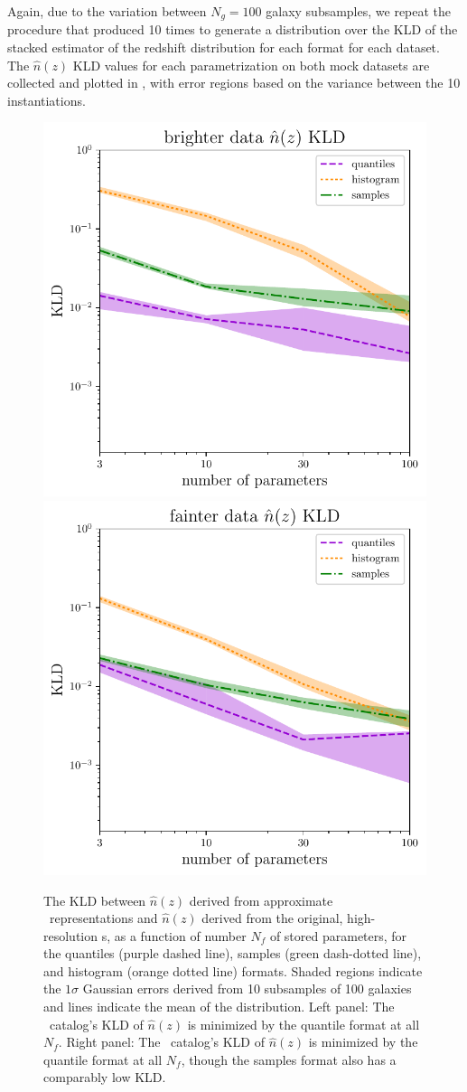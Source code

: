 Again, due to the variation between $N_{g}=100$ galaxy subsamples, we repeat 
the procedure that produced  10 times to generate a 
distribution over the KLD of the stacked estimator of the redshift distribution 
for each format for each dataset.
The $\hat{n}(z)$ KLD values for each parametrization on both mock datasets are 
collected and plotted in , with error regions based on the 
variance between the 10 instantiations.
\begin{figure}
	\begin{center}
		\includegraphics[width=0.49\columnwidth]{figures/qp/graham_nz_kld.pdf}    
		\includegraphics[width=0.49\columnwidth]{figures/qp/schmidt_nz_kld.pdf}
		\caption{The KLD between $\hat{n}(z)$ derived from approximate \pz\ 
			representations and $\hat{n}(z)$ derived from the original, high-resolution \pz 
			s, as a function of number $N_{f}$ of stored parameters, for the quantiles 
			(purple dashed line), samples (green dash-dotted line), and histogram (orange 
			dotted line) formats.
			Shaded regions indicate the $1\sigma$ Gaussian errors derived from 10 
			subsamples of 100 galaxies and lines indicate the mean of the distribution.
			Left panel: The \mgdata \pz\ catalog's KLD of $\hat{n}(z)$ is minimized by 
			the quantile format at all $N_{f}$.
			Right panel: The \ssdata \pz\ catalog's KLD of $\hat{n}(z)$ is minimized by 
			the quantile format at all $N_{f}$, though the samples format also has a 
			comparably low KLD.
			}
	\end{center}
\end{figure}

